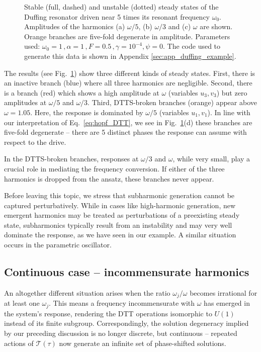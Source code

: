 \begin{figure}[h!]
	\centering
	
	\caption{Stable (full, dashed) and unstable (dotted) steady states of the Duffing resonator driven near 5 times its resonant frequency $\omega_0$. Amplitudes of the harmonics (a) $\omega/5$, (b) $\omega /3$ and (c) $\omega$ are shown. Orange branches are five-fold degenerate in amplitude. Parameters used: $\omega_0 = 1 \,, \alpha = 1 \,, F = 0.5 \,, \gamma = 10^{-4}, \psi=0$. The code used to generate this data is shown in Appendix \ref{sec:app_duffing_example}.}
	\label{fig:hb_duff_sub}
\end{figure}

The results (see Fig.~\ref{fig:hb_duff_sub}) show three different kinds of steady states. First, there is an inactive branch (blue) where all three harmonics are negligible. Second, there is a branch (red) which shows a high amplitude at $\omega$ (variables $u_3, v_3$) but zero amplitudes at $\omega/5$ and $\omega/3$. 
Third, DTTS-broken branches (orange) appear above $\omega=1.05$. Here, the response is dominated by $\omega/5$ (variables $u_1, v_1$).  
In line with our interpretation of Eq.~\eqref{eq:hopf_DTT}, we see in Fig.~\ref{fig:hb_duff_sub}(d) these branches are five-fold degenerate -- there are 5 distinct phases the response can assume with respect to the drive.

In the DTTS-broken branches, responses at $\omega/3$ and $\omega$, while very small, play a crucial role in mediating the frequency conversion. If either of the three harmonics is dropped from the ansatz, these branches never appear. 

Before leaving this topic, we stress that subharmonic generation cannot be captured perturbatively. While in cases like high-harmonic generation, new emergent harmonics may be treated as perturbations of a preexisting steady state, subharmonics typically result from an instability and may very well dominate the response, as we have seen in our example. A similar situation occurs in the parametric oscillator. 

\subsection{Continuous case -- incommensurate harmonics} 

An altogether different situation arises when the ratio $\omega_j / \omega$ becomes irrational for at least one $\omega_j$. This means a frequency incommensurate with $\omega$ has emerged in the system's response, rendering the DTT operations isomorphic to $U(1)$ instead of its finite subgroup. Correspondingly, the solution degeneracy implied by our preceding discussion is no longer discrete, but continuous -- repeated actions of $\mathcal{T}(\tau)$ now generate an infinite set of phase-shifted solutions. 

